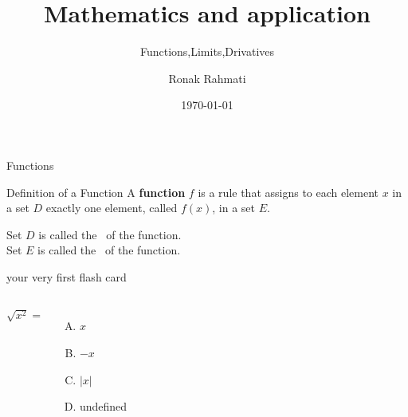 \documentclass{beamer}
\title[Calculus]{Mathematics and application}
\subtitle{Functions,Limits,Drivatives}
\author{Ronak Rahmati}
\institute{Czech university of life science}
\date{\today}
\begin{document}
\begin{frame}
   \titlepage 
\end{frame}



\begin{frame}[t]{Functions} \vspace{4pt}
\begin{block}{Definition of a Function}
\vspace{0.5em}
A \textbf{function} $f$ is a rule that assigns to each element $x$ in a set $D$ exactly one element, called $f(x)$, in a set $E$.
\vspace{0.5em}
\end{block}

\vspace{10pt}
Set $D$ is called the
\, of the function.\\[10pt]

Set $E$ is called the
\, of the function.
\end{frame}



\begin{frame}{your very first flash card}\vspace{10pt}
 \begin{columns}[onlytextwidth]
 $\sqrt{x^2}=$ \\[10pt]
   \begin{enumerate}[(A)]
       \item $x$
       \item $-x$
       \item $|x|$
       \item undefined
   \end{enumerate}
\end{columns}
\end{frame}
\end{document}
